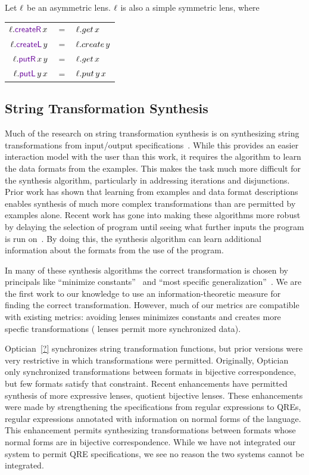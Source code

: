 \documentclass[acmsmall,screen,anonymous]{acmart}
\begin{document}
\begin{theorem}
  Let $\mathit{\ell}$ be an asymmetric lens. $\mathit{\ell}$ is also a simple symmetric lens,
  where
  \begin{center}
    \begin{tabular}{rcl}
      $\Lens.\CreateROf{x}$ & $=$ & $\mathit{\ell}.get \, x$\\
      $\Lens.\CreateLOf{y}$ & $=$ & $\mathit{\ell}.create \, y$\\
      $\Lens.\PutROf{x}{y}$ & $=$ & $\mathit{\ell}.get \, x$\\
      $\Lens.\PutLOf{y}{x}$ & $=$ & $\mathit{\ell}.put \, y \, x$
    \end{tabular}
  \end{center}
\end{theorem}

\subsection{String Transformation Synthesis}
Much of the research on string transformation synthesis is on synthesizing
string transformations from input/output
specifications~\cite{flashfill,flashextract,?}. While this provides an easier
interaction model with the user than this work, it requires the algorithm to
learn the data formats from the examples. This makes the task much more
difficult for the synthesis algorithm, particularly in addressing iterations and
disjunctions. Prior work has shown that learning from examples and data format
descriptions enables synthesis of much more complex transformations than are
permitted by examples alone. Recent work has gone into making these algorithms
more robust by delaying the selection of program until seeing what further
inputs the program is run on~\cite{?}. By doing this, the synthesis algorithm
can learn additional information about the formats from the use of the program.

In many of these synthesis algorithms the correct transformation is chosen by
principals like ``minimize constants''~\cite{?,?,?} and ``most specific
generalization''~\cite{?,?,?}. We are the first work to our knowledge to use an
information-theoretic measure for finding the correct transformation. However,
much of our metrics are compatible with existing metrics: avoiding \Disconnect
lenses minimizes constants and creates more specfic transformations (\Disconnect
lenses permit more synchronized data).

Optician~\ref{?} synchronizes string transformation functions, but prior
versions were very restrictive in which transformations were permitted.
Originally, Optician only synchronized transformations between formats in
bijective correspondence, but few formats satisfy that constraint. Recent
enhancements have permitted synthesis of more expressive lenses, quotient
bijective lenses. These enhancements were made by strengthening the
specifications from regular expressions to QREs, regular expressions annotated
with information on normal forms of the language. This enhancement permits
synthesizing transformations between formats whose normal forms are in bijective
correspondence. While we have not integrated our system to permit QRE
specifications, we see no reason the two systems cannot be integrated.
\end{document}
